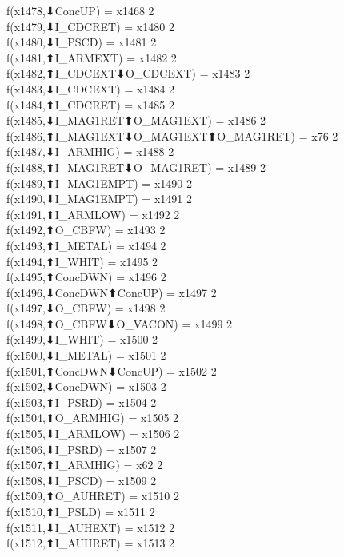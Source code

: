f(x1478,⬇ConcUP) = x1468 {2} \\
f(x1479,⬇I_CDCRET) = x1480 {2} \\
f(x1480,⬇I_PSCD) = x1481 {2} \\
f(x1481,⬆I_ARMEXT) = x1482 {2} \\
f(x1482,⬆I_CDCEXT⬇O_CDCEXT) = x1483 {2} \\
f(x1483,⬇I_CDCEXT) = x1484 {2} \\
f(x1484,⬆I_CDCRET) = x1485 {2} \\
f(x1485,⬇I_MAG1RET⬆O_MAG1EXT) = x1486 {2} \\
f(x1486,⬆I_MAG1EXT⬇O_MAG1EXT⬆O_MAG1RET) = x76 {2} \\
f(x1487,⬇I_ARMHIG) = x1488 {2} \\
f(x1488,⬆I_MAG1RET⬇O_MAG1RET) = x1489 {2} \\
f(x1489,⬆I_MAG1EMPT) = x1490 {2} \\
f(x1490,⬇I_MAG1EMPT) = x1491 {2} \\
f(x1491,⬆I_ARMLOW) = x1492 {2} \\
f(x1492,⬆O_CBFW) = x1493 {2} \\
f(x1493,⬆I_METAL) = x1494 {2} \\
f(x1494,⬆I_WHIT) = x1495 {2} \\
f(x1495,⬆ConcDWN) = x1496 {2} \\
f(x1496,⬇ConcDWN⬆ConcUP) = x1497 {2} \\
f(x1497,⬇O_CBFW) = x1498 {2} \\
f(x1498,⬆O_CBFW⬇O_VACON) = x1499 {2} \\
f(x1499,⬇I_WHIT) = x1500 {2} \\
f(x1500,⬇I_METAL) = x1501 {2} \\
f(x1501,⬆ConcDWN⬇ConcUP) = x1502 {2} \\
f(x1502,⬇ConcDWN) = x1503 {2} \\
f(x1503,⬆I_PSRD) = x1504 {2} \\
f(x1504,⬆O_ARMHIG) = x1505 {2} \\
f(x1505,⬇I_ARMLOW) = x1506 {2} \\
f(x1506,⬇I_PSRD) = x1507 {2} \\
f(x1507,⬆I_ARMHIG) = x62 {2} \\
f(x1508,⬇I_PSCD) = x1509 {2} \\
f(x1509,⬆O_AUHRET) = x1510 {2} \\
f(x1510,⬆I_PSLD) = x1511 {2} \\
f(x1511,⬇I_AUHEXT) = x1512 {2} \\
f(x1512,⬆I_AUHRET) = x1513 {2} \\
